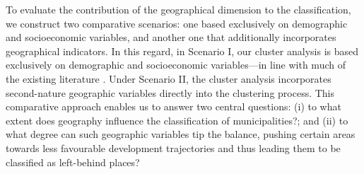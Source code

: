 \documentclass[a4paper,11pt,oneside]{article}
\begin{document}
To evaluate the contribution of the geographical dimension to the classification, we construct two comparative scenarios: one based exclusively on demographic and socioeconomic variables, and another one that additionally incorporates geographical indicators. In this regard, in Scenario I, our cluster analysis is based exclusively on demographic and socioeconomic variables---in line with much of the existing literature \citep{velthuis2024regional}. Under Scenario II, the cluster analysis incorporates second-nature geographic variables directly into the clustering process. This comparative approach enables us to answer two central questions: (i) to what extent does geography influence the classification of municipalities?; and (ii) to what degree can such geographic variables tip the balance, pushing certain areas towards less favourable development trajectories and thus leading them to be classified as left-behind places?
\end{document}
